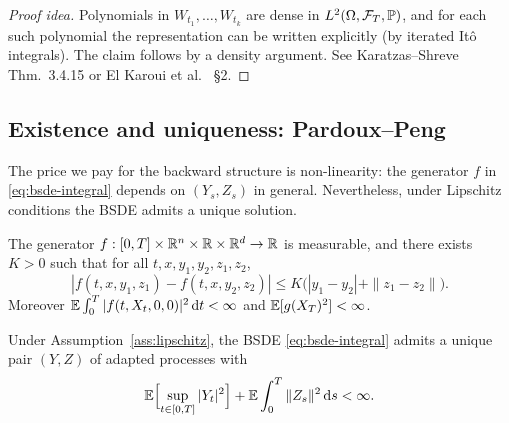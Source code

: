 \begin{proof}[Proof idea]
Polynomials in $W_{t_1}, \ldots, W_{t_k}$ are dense in $L^2(\Omega, \mathcal{F}_T, \mathbb{P})$, and for each such polynomial the representation can be written explicitly (by iterated It\^o integrals). The claim follows by a density argument. See Karatzas--Shreve \cite{karatzas1991} Thm.~3.4.15 or El Karoui et al.\ \cite{elkaroui1997} \S2.
\end{proof}

\subsection{Existence and uniqueness: Pardoux--Peng}

The price we pay for the backward structure is non-linearity: the generator $f$ in \eqref{eq:bsde-integral} depends on $(Y_s, Z_s)$ in general. Nevertheless, under Lipschitz conditions the BSDE admits a unique solution.

\begin{assumption}
\label{ass:lipschitz}
The generator $f : [0, T] \times \mathbb{R}^n \times \mathbb{R} \times \mathbb{R}^d \to \mathbb{R}$ is measurable, and there exists $K > 0$ such that for all $t, x, y_1, y_2, z_1, z_2$,
\begin{equation}
  |f(t, x, y_1, z_1) - f(t, x, y_2, z_2)| \leq K\bigl(|y_1 - y_2| + \|z_1 - z_2\|\bigr).
\end{equation}
Moreover $\mathbb{E}\int_0^T |f(t, X_t, 0, 0)|^2 \, \mathrm{d} t < \infty$ and $\mathbb{E}[g(X_T)^2] < \infty$.
\end{assumption}

\begin{theorem}
\label{thm:pardoux-peng}
Under Assumption~\ref{ass:lipschitz}, the BSDE \eqref{eq:bsde-integral} admits a unique pair $(Y, Z)$ of adapted processes with
\begin{equation}
  \mathbb{E}\Bigl[\sup_{t \in [0, T]} |Y_t|^2\Bigr] + \mathbb{E}\int_0^T \|Z_s\|^2 \, \mathrm{d} s < \infty.
\end{equation}
\end{theorem}

